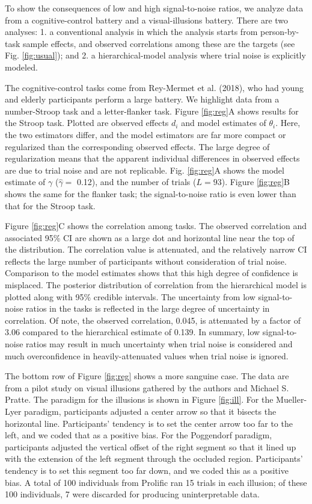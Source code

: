 \documentclass[
  ,man]{apa6}
\begin{document}
To show the consequences of low and high signal-to-noise ratios, we analyze data from a cognitive-control battery and a visual-illusions battery. There are two analyses: 1. a conventional analysis in which the analysis starts from person-by-task sample effects, and observed correlations among these are the targets (see Fig. \ref{fig:usual}); and 2. a hierarchical-model analysis where trial noise is explicitly modeled.

The cognitive-control tasks come from Rey-Mermet et al. (2018), who had young and elderly participants perform a large battery. We highlight data from a number-Stroop task and a letter-flanker task. Figure \ref{fig:reg}A shows results for the Stroop task. Plotted are observed effects \(d_i\) and model estimates of \(\theta_i\). Here, the two estimators differ, and the model estimators are far more compact or regularized than the corresponding observed effects. The large degree of regularization means that the apparent individual differences in observed effects are due to trial noise and are not replicable. Fig. \ref{fig:reg}A shows the model estimate of \(\gamma\) (\(\hat{\gamma}=\)
0.12), and the number of trials (\(L=93\)). Figure \ref{fig:reg}B shows the same for the flanker task; the signal-to-noise ratio is even lower than that for the Stroop task.

Figure \ref{fig:reg}C shows the correlation among tasks. The observed correlation and associated 95\% CI are shown as a large dot and horizontal line near the top of the distribution. The correlation value is attenuated, and the relatively narrow CI reflects the large number of participants without consideration of trial noise. Comparison to the model estimates shows that this high degree of confidence is misplaced. The posterior distribution of correlation from the hierarchical model is plotted along with 95\% credible intervals. The uncertainty from low signal-to-noise ratios in the tasks is reflected in the large degree of uncertainty in correlation. Of note, the observed correlation, 0.045, is attenuated by a factor of 3.06 compared to the hierarchical estimate of 0.139. In summary, low signal-to-noise ratios may result in much uncertainty when trial noise is considered and much overconfidence in heavily-attenuated values when trial noise is ignored.

The bottom row of Figure \ref{fig:reg} shows a more sanguine case. The data are from a pilot study on visual illusions gathered by the authors and Michael S. Pratte. The paradigm for the illusions is shown in Figure \ref{fig:ill}. For the Mueller-Lyer paradigm, participants adjusted a center arrow so that it bisects the horizontal line. Participants' tendency is to set the center arrow too far to the left, and we coded that as a positive bias. For the Poggendorf paradigm, participants adjusted the vertical offset of the right segment so that it lined up with the extension of the left segment through the occluded region. Participants' tendency is to set this segment too far down, and we coded this as a positive bias. A total of 100 individuals from Prolific ran 15 trials in each illusion; of these 100 individuals, 7 were discarded for producing uninterpretable data.
\end{document}
